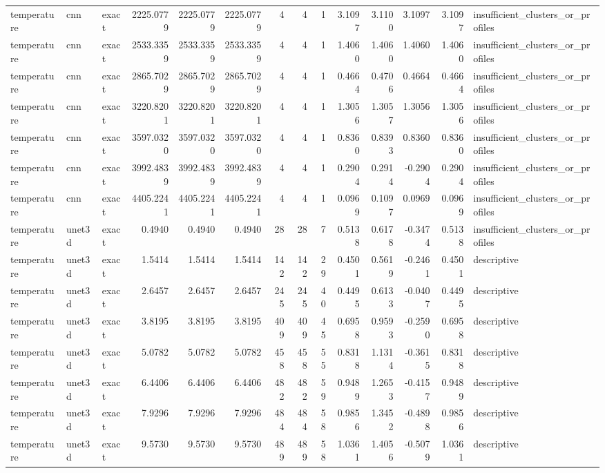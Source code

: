 \begin{tabular}{lllrrrrrrrrrrl}
temperature & cnn & exact & 2225.0779 & 2225.0779 & 2225.0779 & 4 & 4 & 1 & 3.1097 & 3.1100 & 3.1097 & 3.1097 & insufficient_clusters_or_profiles \\
temperature & cnn & exact & 2533.3359 & 2533.3359 & 2533.3359 & 4 & 4 & 1 & 1.4060 & 1.4060 & 1.4060 & 1.4060 & insufficient_clusters_or_profiles \\
temperature & cnn & exact & 2865.7029 & 2865.7029 & 2865.7029 & 4 & 4 & 1 & 0.4664 & 0.4706 & 0.4664 & 0.4664 & insufficient_clusters_or_profiles \\
temperature & cnn & exact & 3220.8201 & 3220.8201 & 3220.8201 & 4 & 4 & 1 & 1.3056 & 1.3057 & 1.3056 & 1.3056 & insufficient_clusters_or_profiles \\
temperature & cnn & exact & 3597.0320 & 3597.0320 & 3597.0320 & 4 & 4 & 1 & 0.8360 & 0.8393 & 0.8360 & 0.8360 & insufficient_clusters_or_profiles \\
temperature & cnn & exact & 3992.4839 & 3992.4839 & 3992.4839 & 4 & 4 & 1 & 0.2904 & 0.2914 & -0.2904 & 0.2904 & insufficient_clusters_or_profiles \\
temperature & cnn & exact & 4405.2241 & 4405.2241 & 4405.2241 & 4 & 4 & 1 & 0.0969 & 0.1097 & 0.0969 & 0.0969 & insufficient_clusters_or_profiles \\
temperature & unet3d & exact & 0.4940 & 0.4940 & 0.4940 & 28 & 28 & 7 & 0.5138 & 0.6178 & -0.3474 & 0.5138 & insufficient_clusters_or_profiles \\
temperature & unet3d & exact & 1.5414 & 1.5414 & 1.5414 & 142 & 142 & 29 & 0.4501 & 0.5619 & -0.2461 & 0.4501 & descriptive \\
temperature & unet3d & exact & 2.6457 & 2.6457 & 2.6457 & 245 & 245 & 40 & 0.4495 & 0.6133 & -0.0407 & 0.4495 & descriptive \\
temperature & unet3d & exact & 3.8195 & 3.8195 & 3.8195 & 409 & 409 & 45 & 0.6958 & 0.9593 & -0.2590 & 0.6958 & descriptive \\
temperature & unet3d & exact & 5.0782 & 5.0782 & 5.0782 & 458 & 458 & 55 & 0.8318 & 1.1314 & -0.3615 & 0.8318 & descriptive \\
temperature & unet3d & exact & 6.4406 & 6.4406 & 6.4406 & 482 & 482 & 59 & 0.9489 & 1.2653 & -0.4157 & 0.9489 & descriptive \\
temperature & unet3d & exact & 7.9296 & 7.9296 & 7.9296 & 484 & 484 & 58 & 0.9856 & 1.3452 & -0.4898 & 0.9856 & descriptive \\
temperature & unet3d & exact & 9.5730 & 9.5730 & 9.5730 & 489 & 489 & 58 & 1.0361 & 1.4056 & -0.5079 & 1.0361 & descriptive \\

\end{tabular}
